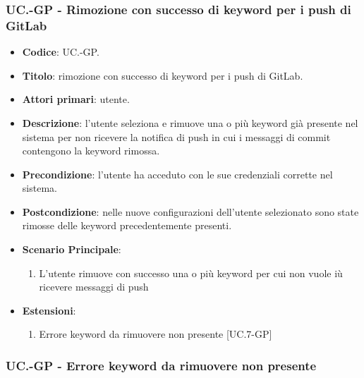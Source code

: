 	\subsubsection{UC\theuccount.\thesubuccount-GP - Rimozione con successo di keyword per i push di GitLab}
	
	\begin{itemize}
		\item \textbf{Codice}: UC\theuccount.\thesubuccount-GP.
		\item \textbf{Titolo}: rimozione con successo di keyword per i push di GitLab.
		\item \textbf{Attori primari}: utente.
		\item \textbf{Descrizione}: l’utente seleziona e rimuove una o più keyword già presente nel sistema per non ricevere la notifica di push in
		cui i messaggi di commit contengono la keyword rimossa.
		\item \textbf{Precondizione}:  l’utente ha acceduto con le sue credenziali corrette nel sistema.
		\item \textbf{Postcondizione}: nelle nuove configurazioni dell'utente selezionato sono state rimosse delle keyword precedentemente presenti.
		\item \textbf{Scenario Principale}:
		\begin{enumerate}
			\item L'utente rimuove con successo una o più keyword per cui non vuole iù ricevere messaggi di push
		\end{enumerate}
		\item \textbf{Estensioni}:
		\begin{enumerate}
			\item Errore keyword da rimuovere non presente [UC\theuccount.7-GP]
		\end{enumerate}
	\end{itemize}
	
	\subsubsection{UC\theuccount.\thesubuccount-GP - Errore keyword da rimuovere non presente}
	
